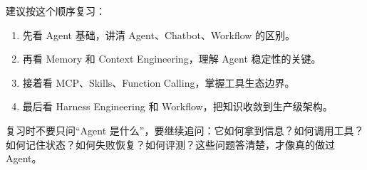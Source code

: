\documentclass[9pt,a4paper,twocolumn]{ctexart}
\begin{document}
建议按这个顺序复习：


\begin{enumerate}[itemsep=1pt, topsep=2pt]
  \item 先看 Agent 基础，讲清 Agent、Chatbot、Workflow 的区别。
  \item 再看 Memory 和 Context Engineering，理解 Agent 稳定性的关键。
  \item 接着看 MCP、Skills、Function Calling，掌握工具生态边界。
  \item 最后看 Harness Engineering 和 Workflow，把知识收敛到生产级架构。
\end{enumerate}


复习时不要只问“Agent 是什么”，要继续追问：它如何拿到信息？如何调用工具？如何记住状态？如何失败恢复？如何评测？这些问题答清楚，才像真的做过 Agent。
\end{document}
